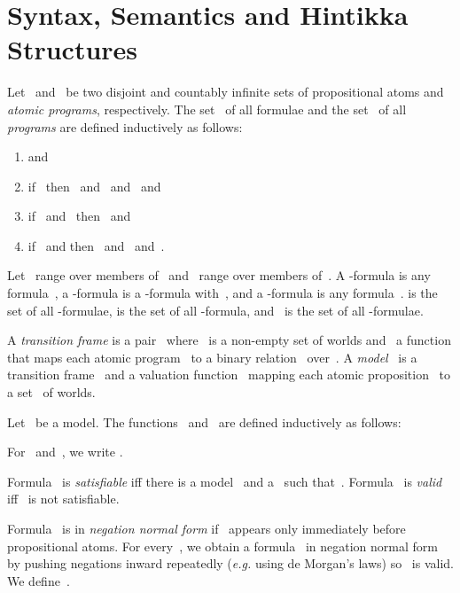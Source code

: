 \documentclass{entcs}
\newcommand{\eg}{\emph{e.g.}}
\newcommand{\fea}{}
\newcommand{\fean}{}
\newcommand{\fear}{}
\begin{document}
\section{Syntax, Semantics and Hintikka Structures}

\begin{definition}
  Let~ and~ be two disjoint and countably infinite sets of propositional atoms
  and \emph{atomic programs}, respectively.
  The set~ of all formulae and the set~ of all \emph{programs}
  are defined inductively as follows:
  \begin{enumerate}
  \item  and~
  \item if~ then~
    and~ and~ and~
  \item if~ and~ then~ and~
  \item if~ and  then~ and~ and~.
  \end{enumerate}
  Let~ range over members of~
  and~ range over members of~.
  A \fea{}-formula is any formula~,
  a \fean{}-formula is a \fea{}-formula 
   with~,
  and a \fear{}-formula is any formula~.
   is the set of all \fea{}-formulae,
   is the set of all \fean{}-formula,
  and~ is the set of all \fear{}-formulae.
\end{definition}

\begin{definition}
  A \emph{transition frame} is a pair~
  where~ is a non-empty set of worlds and~ a function
  that maps each atomic program~ to a binary relation~ over~.
  A \emph{model}~ is a transition frame~
  and a valuation function~
  mapping each atomic proposition~ to
  a set~ of worlds.
\end{definition}

\begin{definition}
  Let~ be a model.
  The functions~ and~
  are defined inductively as follows:
  
  For~ and~, we write
  .
\end{definition}

\begin{definition}
  Formula~ is \emph{satisfiable}
  iff there is a model~ and a~
  such that~.
  Formula~ is \emph{valid} iff~ is not satisfiable.
\end{definition}

\begin{definition}
  Formula~ is in \emph{negation normal form}
  if~ appears only immediately before propositional atoms.
  For every~,
  we obtain a formula~ in negation normal form
  by pushing negations inward repeatedly
  (\eg{} using de Morgan's laws)
  so~ is valid.
  We define~.
\end{definition}
\end{document}
